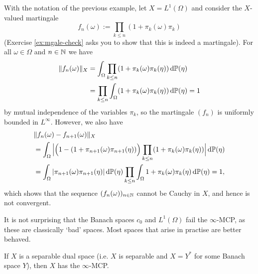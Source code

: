 \begin{example}\label{eg:L1-noMCP}
  With the notation of the previous example, let $X = L^1(\Omega)$ and consider the $X$-valued martingale
  \begin{equation}\label{eq:L1-example-mgale}
    f_n(\omega) := \prod_{k \leq n} (1 + \pi_{k}(\omega)\pi_k)
  \end{equation}
  (Exercise \ref{ex:mgale-check} asks you to show that this is indeed a martingale).
  For all $\omega \in \Omega$ and $n \in \mathbb{N}$ we have
  \begin{equation*}
    \begin{aligned}
      \|f_n(\omega)\|_{X} &= \int_{\Omega} \prod_{k \leq n} (1 + \pi_k(\omega)\pi_k(\eta))  \, \mathrm{d}\mathbb{P}(\eta) \\
      &= \prod_{k \leq n} \int_{\Omega}  (1 + \pi_k(\omega)\pi_k(\eta)) \, \mathrm{d}\mathbb{P}(\eta)
      = 1
    \end{aligned}
  \end{equation*}
  by mutual independence of the variables $\pi_k$, so the martingale $(f_n)$ is uniformly bounded in $L^\infty$.
  However, we also have
  \begin{equation*}
    \begin{aligned}
      &\|f_n(\omega) - f_{n+1}(\omega)\|_{X} \\
      &= \int_{\Omega} \Big| \Big(1 - (1 + \pi_{n+1}(\omega)\pi_{n+1}(\eta))\Big)\prod_{k \leq n} (1 + \pi_k(\omega)\pi_k(\eta)) \Big|\, \mathrm{d}\mathbb{P}(\eta) \\
      &= \int_{\Omega} |\pi_{n+1}(\omega) \pi_{n+1}(\eta)| \, \mathrm{d}\mathbb{P}(\eta) \prod_{k \leq n} \int_{\Omega} 1 + \pi_k(\omega)\pi_k(\eta) \, \mathrm{d}\mathbb{P}(\eta) = 1,
    \end{aligned}
  \end{equation*}
  which shows that the sequence $(f_n(\omega))_{n \in \mathbb{N}}$ cannot be Cauchy in $X$, and hence is not convergent.
\end{example}

It is not surprising that the Banach spaces $c_0$ and $L^1(\Omega)$ fail the $\infty$-MCP, as these are classically `bad' spaces.
Most spaces that arise in practise are better behaved.

\begin{thm}\label{thm:MCP-sepdual}
  If $X$ is a separable dual space (i.e. $X$ is separable and $X = Y^*$ for some Banach space $Y$), then $X$ has the $\infty$-MCP.
\end{thm}

